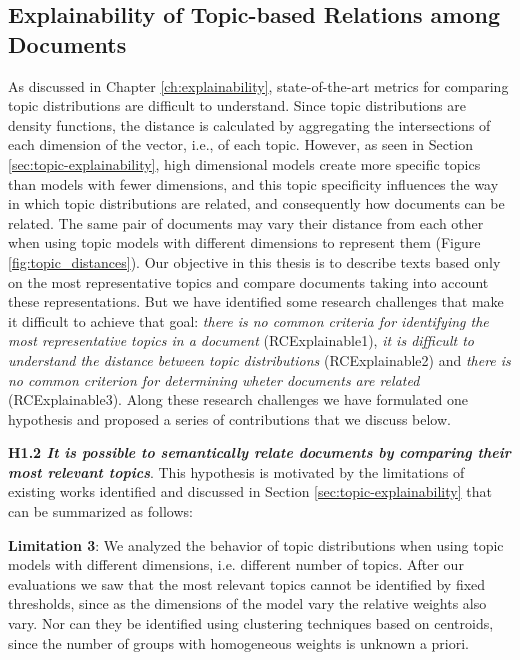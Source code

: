 \subsection{Explainability of Topic-based Relations among Documents}

As discussed in Chapter \ref{ch:explainability}, state-of-the-art metrics for comparing topic distributions are difficult to understand. Since topic distributions are density functions, the distance is calculated by aggregating the intersections of each dimension of the vector, i.e., of each topic. However, as seen in Section \ref{sec:topic-explainability}, high dimensional models create more specific topics than models with fewer dimensions, and this topic specificity influences the way in which topic distributions are related, and consequently how documents can be related. The same pair of documents may vary their distance from each other when using topic models with different dimensions to represent them (Figure \ref{fig:topic_distances}). Our objective in this thesis is to describe texts based only on the most representative topics and compare documents taking into account these representations. But we have identified some research challenges that make it difficult to achieve that goal: \textit{there is no common criteria for identifying the most representative topics in a document} (RCExplainable1), \textit{it is difficult to understand the distance between topic distributions} (RCExplainable2) and \textit{there is no common criterion for determining wheter documents are related} (RCExplainable3). Along these research challenges we have formulated one hypothesis and proposed a series of contributions that we discuss below.

\textbf{H1.2 \textit{It is possible to semantically relate documents by comparing their most relevant topics}}. This hypothesis is motivated by the limitations of existing works identified and discussed in Section \ref{sec:topic-explainability} that can be summarized as follows:

\textbf{Limitation 3}: We analyzed the behavior of topic distributions when using topic models with different dimensions, i.e. different number of topics. After our evaluations we saw that the most relevant topics cannot be identified by fixed thresholds, since as the dimensions of the model vary the relative weights also vary. Nor can they be identified using clustering techniques based on centroids, since the number of groups with homogeneous weights is unknown a priori.

